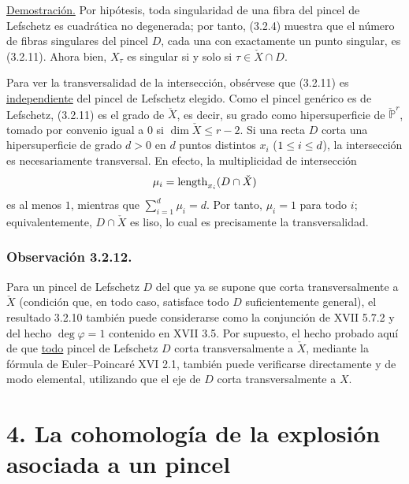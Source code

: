 \noindent\underline{Demostración.}
Por hipótesis, toda singularidad de una fibra del pincel de Lefschetz
es cuadrática no degenerada; por tanto, (3.2.4) muestra que el número
de fibras singulares del pincel $D$, cada una con exactamente un punto
singular, es (3.2.11). Ahora bien, $X_\tau$ es singular si y solo si
$\tau\in\check X\cap D$.

Para ver la transversalidad de la intersección, obsérvese que
(3.2.11) es \underline{independiente} del pincel de Lefschetz elegido.
Como el pincel genérico es de Lefschetz, (3.2.11) es el grado de
$\check X$, es decir, su grado como hipersuperficie de
$\check{\mathbb P}^{r}$, tomado por convenio igual a $0$ si
$\dim\check X\leq r-2$. Si una recta $D$ corta una hipersuperficie de
grado $d>0$ en $d$ puntos distintos $x_i$
($\sisi{i\leq i\leq d}{1\leq i\leq d}$), la intersección es
necesariamente transversal. En efecto, la multiplicidad de
intersección
\[
\mu_i=\sisi{\operatorname{rg}}{\operatorname{length}}_{x_i}
      (D\cap\check X)
\]
es al menos $1$, mientras que $\sum_{i=1}^d\mu_i=d$. Por tanto,
$\mu_i=1$ para todo $i$; equivalentemente, $D\cap\check X$ es liso,
lo cual es precisamente la transversalidad.

\pageoriginale

\subsubsection*{Observación 3.2.12.}
Para un pincel de Lefschetz $D$ del que ya se supone que corta
transversalmente a $\check X$ (condición que, en todo caso, satisface
todo $D$ suficientemente general), el resultado 3.2.10 también puede
considerarse como la conjunción de XVII 5.7.2 y del hecho
$\deg\varphi=1$ contenido en XVII 3.5. Por supuesto, el hecho probado
aquí de que \underline{todo} pincel de Lefschetz $D$ corta
transversalmente a $\check X$, mediante la fórmula de Euler--Poincaré
XVI 2.1, también puede verificarse directamente y de modo elemental,
utilizando que el eje de $D$ corta transversalmente a $X$.

\section*{4. La cohomología de la explosión asociada a un pincel}

